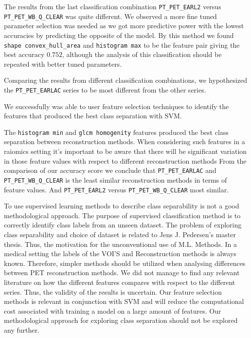The results from the last classification combination
 \verb|PT_PET_EARL2| versus \verb|PT_PET_WB_Q_CLEAR| was quite different. 
 We observed a more fine tuned 
 parameter selection was needed as we got more predictive power with the lowest accuracies by predicting the 
 opposite of the model. By this method we found \verb|shape convex_hull_area| and \verb|histogram max| 
 to be the feature pair giving the best accuracy $0.752$, although the analysis of this classification 
 should be repeated with better tuned parameters.  



 Comparing the results from different classification combinations, we hypothesized the \verb|PT_PET_EARLAC| 
 series to be most different from the other series. 


 We successfully was able to user feature selection techniques to identify the
 features that produced the best class separation with SVM.     

The \verb|histogram min| and \verb|glcm homogenity| features produced the best
class separation between reconstruction methods.     
When considering such features in a raiomics setting it's important to be
aware that there will be significant variation in those feature values with
respect to different reconstruction methods
From the comparison of our accuracy score we conclude that    
\verb|PT_PET_EARLAC| and \verb|PT_PET_WB_Q_CLEAR|
is the least similar reconstruction methods  in terms of feature values.   
And \verb|PT_PET_EARL2| versus \verb|PT_PET_WB_Q_CLEAR| most similar. 


To use supervised learning methods to describe class separability is not a
good methodological approach. The purpose of supervised classification
method is to correctly identify class labels from an unseen dataset.     
The problem of exploring class separability and choice of dataset is
related to Jens J. Pedersen's master thesis. Thus, the motivation for the 
unconventional use of M.L. Methods. In a medical setting the labels of the
VOI'S and Reconstruction methods is always known. Therefore, simpler methods
should be utilized when analysing differences between PET reconstruction
methods. We did not manage to find any relevant literature on how the different features compares
with respect to the different series. Thus, the validity of the results is
uncertain. Our feature selection methods is relevant in conjunction with SVM and
will reduce the computational cost associated with training a model on a large
amount of features. Our methodological approach for exploring class separation
should not be explored any further. 
 




% 
